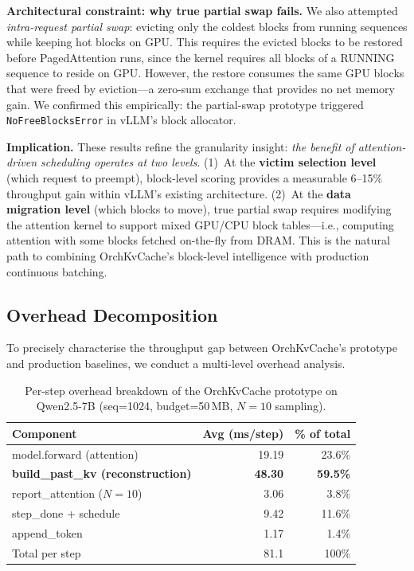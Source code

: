 \documentclass[conference]{IEEEtran}
\begin{document}
\textbf{Architectural constraint: why true partial swap fails.} We also attempted \emph{intra-request partial swap}: evicting only the coldest blocks from running sequences while keeping hot blocks on GPU. This requires the evicted blocks to be restored before PagedAttention runs, since the kernel requires all blocks of a RUNNING sequence to reside on GPU. However, the restore consumes the same GPU blocks that were freed by eviction---a zero-sum exchange that provides no net memory gain. We confirmed this empirically: the partial-swap prototype triggered \texttt{NoFreeBlocksError} in vLLM's block allocator.

\textbf{Implication.} These results refine the granularity insight: \emph{the benefit of attention-driven scheduling operates at two levels}. (1)~At the \textbf{victim selection level} (which request to preempt), block-level scoring provides a measurable 6--15\% throughput gain within vLLM's existing architecture. (2)~At the \textbf{data migration level} (which blocks to move), true partial swap requires modifying the attention kernel to support mixed GPU/CPU block tables---i.e., computing attention with some blocks fetched on-the-fly from DRAM. This is the natural path to combining OrchKvCache's block-level intelligence with production continuous batching.


\subsection{Overhead Decomposition}
\label{sec:overhead}

To precisely characterise the throughput gap between OrchKvCache's prototype and production baselines, we conduct a multi-level overhead analysis.

\begin{table}[t]
\centering
\caption{Per-step overhead breakdown of the OrchKvCache prototype on Qwen2.5-7B (seq=1024, budget=50\,MB, $N{=}10$ sampling).}
\label{tab:overhead-breakdown}
\small
\begin{tabular}{@{}lrr@{}}
\toprule
Component & Avg (ms/step) & \% of total \\
\midrule
model.forward (attention) & 19.19 & 23.6\% \\
\textbf{build\_past\_kv (reconstruction)} & \textbf{48.30} & \textbf{59.5\%} \\
report\_attention ($N{=}10$) & 3.06 & 3.8\% \\
step\_done + schedule & 9.42 & 11.6\% \\
append\_token & 1.17 & 1.4\% \\
\midrule
Total per step & 81.1 & 100\% \\
\bottomrule
\end{tabular}
\end{table}
\end{document}
